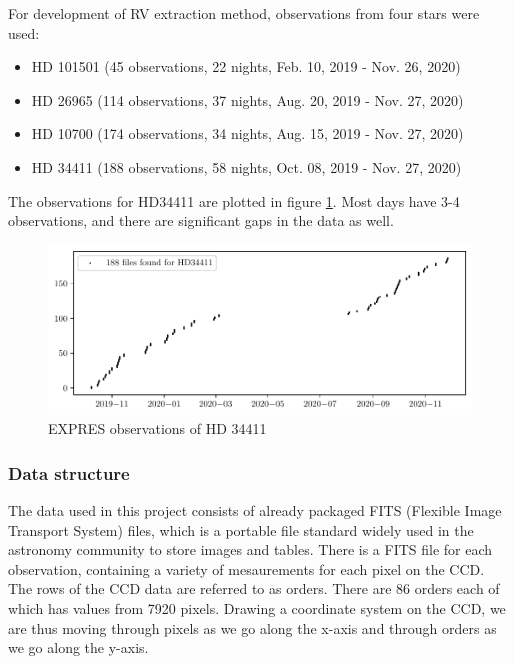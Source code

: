 For development of RV extraction method, observations from four stars were used: 

\begin{itemize}
    \item HD 101501 (45 observations, 22 nights, Feb. 10, 2019 - Nov. 26, 2020)
    \item HD 26965 (114 observations, 37 nights, Aug. 20, 2019 - Nov. 27, 2020)
    \item HD 10700 (174 observations, 34 nights, Aug. 15, 2019 - Nov. 27, 2020)
    \item HD 34411 (188 observations, 58 nights, Oct. 08, 2019 - Nov. 27, 2020)
\end{itemize}

The observations for HD34411 are plotted in figure \ref{fig:dates_HD34411}. Most days have 3-4 observations, and there are significant gaps in the data as well.

\begin{figure}%
    \begin{wide}  
        \includegraphics[width=\textwidth]{figures/dates_HD34411.pdf}
        \caption{EXPRES observations of HD 34411}
    \label{fig:dates_HD34411}
    \end{wide}
\end{figure}
        

\subsubsection{Data structure}
The data used in this project consists of already packaged FITS (Flexible Image Transport System) files, which is a portable file standard widely used in the astronomy community to store images and tables. There is a FITS file for each observation, containing a variety of mesaurements for each pixel on the CCD. 
The rows of the CCD data are referred to as orders. There are 86 orders each of which has values from 7920 pixels. Drawing a coordinate system on the CCD, we are thus moving through pixels as we go along the x-axis and through orders as we go along the y-axis.

